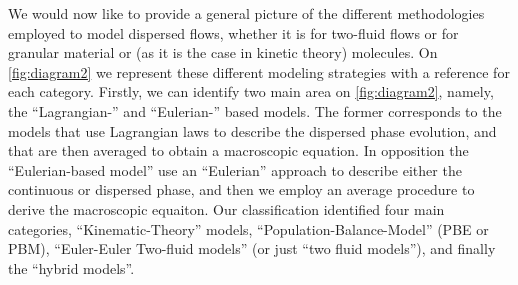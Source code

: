 We would now like to provide a general picture of the different methodologies employed to model dispersed flows, whether it is for two-fluid flows or for granular material or (as it is the case in kinetic theory) molecules. 
On \ref{fig:diagram2} we represent these different modeling strategies with a reference for each category. 
Firstly, we can identify two main area on \ref{fig:diagram2}, namely, the ``Lagrangian-'' and ``Eulerian-'' based models. 
The former corresponds to the models that use Lagrangian laws to describe the dispersed phase evolution, and that are then averaged to obtain a macroscopic equation. 
In opposition the ``Eulerian-based model'' use an ``Eulerian'' approach to describe either the continuous or dispersed phase, and then we employ an average procedure to derive the macroscopic equaiton. 
Our classification identified four main categories, ``Kinematic-Theory'' models, ``Population-Balance-Model'' (PBE or PBM), ``Euler-Euler Two-fluid models'' (or just ``two fluid models''), and finally the ``hybrid models''. 
